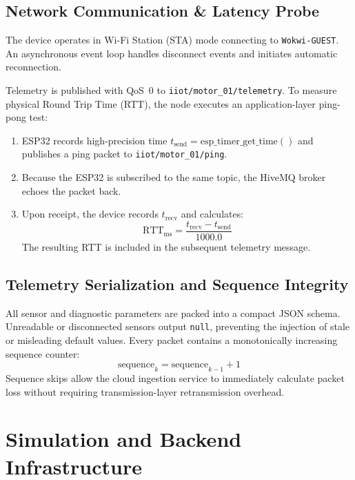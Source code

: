 \documentclass[12pt,a4paper]{report}
\begin{document}
\section{Network Communication \& Latency Probe}
The device operates in Wi-Fi Station (STA) mode connecting to \texttt{Wokwi-GUEST}. An asynchronous event loop handles disconnect events and initiates automatic reconnection.

Telemetry is published with QoS~0 to \texttt{iiot/motor\_01/telemetry}. To measure physical Round Trip Time (RTT), the node executes an application-layer ping-pong test:
\begin{enumerate}
    \item ESP32 records high-precision time $t_{\text{send}} = \text{esp\_timer\_get\_time}()$ and publishes a ping packet to \texttt{iiot/motor\_01/ping}.
    \item Because the ESP32 is subscribed to the same topic, the HiveMQ broker echoes the packet back.
    \item Upon receipt, the device records $t_{\text{recv}}$ and calculates:
    \begin{equation}
        \text{RTT}_{\text{ms}} = \frac{t_{\text{recv}} - t_{\text{send}}}{1000.0}
    \end{equation}
    The resulting RTT is included in the subsequent telemetry message.
\end{enumerate}

\section{Telemetry Serialization and Sequence Integrity}
All sensor and diagnostic parameters are packed into a compact JSON schema. Unreadable or disconnected sensors output \texttt{null}, preventing the injection of stale or misleading default values.
Every packet contains a monotonically increasing sequence counter:
\begin{equation}
    \text{sequence}_{k} = \text{sequence}_{k-1} + 1
\end{equation}
Sequence skips allow the cloud ingestion service to immediately calculate packet loss without requiring transmission-layer retransmission overhead.

\chapter{Simulation and Backend Infrastructure}
\end{document}
